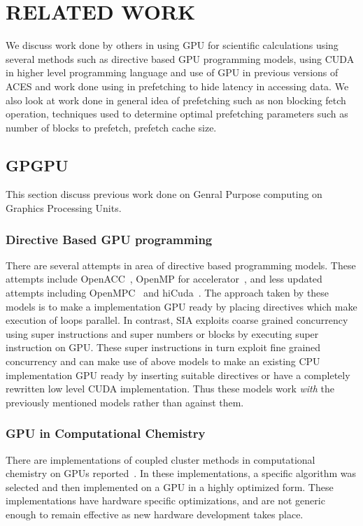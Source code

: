 \chapter{RELATED WORK}\label{lit}

We discuss work done by others in using GPU for scientific calculations using
several methods such as directive based GPU programming models, using CUDA in
higher level programming language and use of GPU in previous versions of ACES
and work done using in prefetching to hide latency in accessing data. We also look
at work done in general idea of prefetching such as non blocking fetch operation,
techniques used to determine optimal prefetching parameters such as number of
blocks to prefetch, prefetch cache size.

\section{GPGPU}
This section discuss previous work done on Genral Purpose computing on Graphics
Processing Units.

\subsection{Directive Based GPU programming}
There are several attempts in area of directive based programming models. These
attempts include OpenACC~\cite{openacc}, OpenMP for
accelerator~\cite{openmpforaccelerators}, and less updated attempts including
OpenMPC~\cite{openmpc} and hiCuda~\cite{hicuda}. The approach taken by these models
is to make a implementation GPU ready by placing directives which make
execution of loops parallel. In contrast, SIA exploits coarse grained
concurrency using super instructions and super numbers or blocks by executing
super instruction on GPU. These super instructions in turn exploit fine grained
concurrency and can make use of above models to make an existing CPU implementation
GPU ready by inserting suitable directives or have a completely rewritten low level
CUDA implementation. Thus these models work \textit{with} the previously mentioned
models rather than against them.

\subsection{GPU in Computational Chemistry}
There are implementations of coupled cluster methods in computational chemistry
on GPUs reported~\cite{bhaskar2013}\cite{deprince2011}\cite{maw2011}. In these
implementations, a specific algorithm was selected and then implemented on a
GPU in a highly optimized form. These implementations have hardware specific
optimizations, and are not generic enough to remain effective as new hardware
development takes place.

